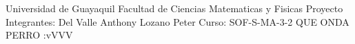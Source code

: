 \begin{center}
Universidad de Guayaquil
Facultad de Ciencias Matematicas y Fisicas
Proyecto
Integrantes:
Del Valle Anthony
Lozano Peter
Curso: SOF-S-MA-3-2
QUE ONDA PERRO :vVVV
\end{center}



